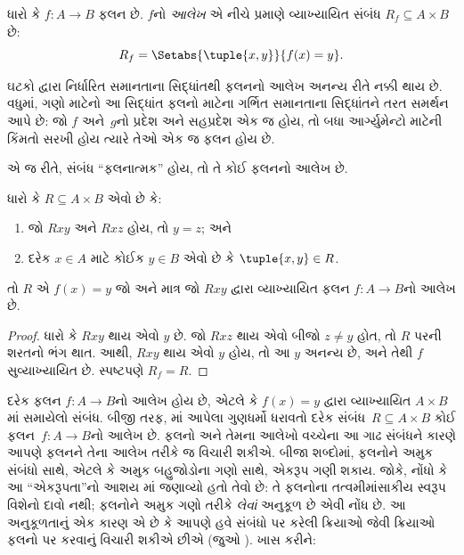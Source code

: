 \begin{defn}[ફલનનો આલેખ] ધારો કે $f\colon A \to B$
ફલન છે. $f$નો \emph{આલેખ} એ નીચે પ્રમાણે વ્યાખ્યાયિત
સંબંધ $R_f \subseteq A \times B$ છે:
\[
R_f = \Setabs{\tuple{x,y}}{f(x) = y}.
\]
\end{defn}

\begin{explain}
ઘટકો દ્વારા નિર્ધારિત સમાનતાના સિદ્ધાંતથી ફલનનો
આલેખ અનન્ય રીતે નક્કી થાય છે. વધુમાં, ગણો માટેનો
આ સિદ્ધાંત ફલનો માટેના ગર્ભિત સમાનતાના સિદ્ધાંતને
તરત સમર્થન આપે છે: જો $f$ અને~$g$નો પ્રદેશ અને
સહપ્રદેશ એક જ હોય, તો બધા આર્ગ્યુમેન્ટો માટેની કિંમતો
સરખી હોય ત્યારે તેઓ એક જ ફલન હોય છે.

એ જ રીતે, સંબંધ “ફલનાત્મક” હોય, તો તે કોઈ
ફલનનો આલેખ છે.
\end{explain}

\begin{prop}
ધારો કે $R \subseteq A \times B$ એવો છે કે:
\begin{enumerate}
\item જો $Rxy$ અને $Rxz$ હોય, તો $y = z$; અને
\item દરેક $x \in A$ માટે કોઈક $y \in B$ એવો છે
કે $\tuple{x,
y} \in R$.
\end{enumerate}
તો $R$ એ $f(x) = y$ જો અને માત્ર જો $Rxy$
દ્વારા વ્યાખ્યાયિત ફલન $f\colon A \to B$નો આલેખ છે.
\end{prop}

\begin{proof}
ધારો કે $Rxy$ થાય એવો $y$ છે. જો $Rxz$ થાય એવો
બીજો $z \neq
y$ હોત, તો $R$ પરની શરતનો ભંગ થાત.
આથી, $Rxy$ થાય એવો $y$ હોય, તો આ $y$ અનન્ય છે,
અને તેથી $f$ સુવ્યાખ્યાયિત છે. સ્પષ્ટપણે $R_f = R$.
\end{proof}

\begin{explain}
દરેક ફલન $f\colon A \to B$નો આલેખ હોય છે, એટલે કે
$f(x) = y$ દ્વારા વ્યાખ્યાયિત $A
\times B$માં સમાયેલો સંબંધ. બીજી તરફ,
માં આપેલા ગુણધર્મો ધરાવતો
દરેક સંબંધ~$R
\subseteq A \times B$ કોઈ ફલન~$f \colon A \to
B$નો આલેખ છે. ફલનો અને તેમના આલેખો વચ્ચેના આ ગાઢ
સંબંધને કારણે આપણે ફલનને તેના આલેખ તરીકે જ વિચારી શકીએ.
બીજા શબ્દોમાં, ફલનોને અમુક સંબંધો સાથે, એટલે કે અમુક
બહુજોડોના ગણો સાથે, એકરૂપ ગણી શકાય.
જોકે, નોંધો કે આ “એકરૂપતા”નો
આશય માં જણાવ્યો હતો તેવો છે:
તે ફલનોના તત્વમીમાંસાકીય સ્વરૂપ વિશેનો દાવો નથી;
ફલનોને અમુક ગણો તરીકે \emph{લેવાં} અનુકૂળ છે એવી
નોંધ છે. આ અનુકૂળતાનું એક કારણ એ છે કે આપણે
હવે સંબંધો પર કરેલી ક્રિયાઓ જેવી ક્રિયાઓ ફલનો પર
કરવાનું વિચારી શકીએ છીએ (જુઓ ).
ખાસ કરીને:
\end{explain}

